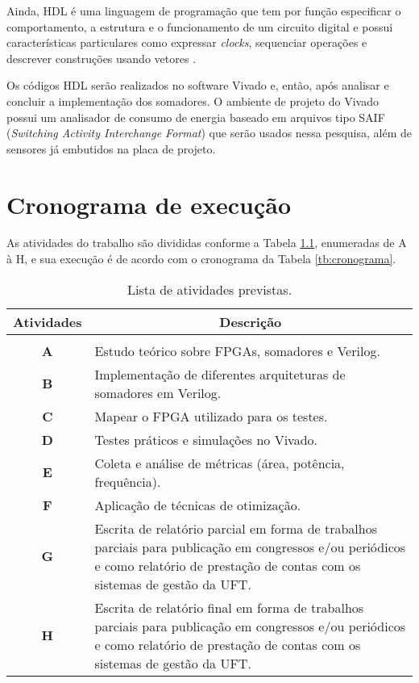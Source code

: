 \documentclass[12pt,consuni]{uftpibic}
\begin{document}
Ainda, HDL é uma linguagem de programação que tem por função especificar o comportamento, a estrutura e o funcionamento de um circuito digital e possui características particulares como expressar \textit{clocks}, sequenciar operações e descrever construções usando vetores \cite{Flake2020}. 

Os códigos HDL serão realizados no software Vivado e, então, após analisar e concluir a implementação dos somadores. O ambiente de projeto do Vivado possui um analisador de consumo de energia baseado em arquivos tipo SAIF (\textit{Switching Activity Interchange Format}) que serão usados nessa pesquisa, além de sensores já embutidos na placa de projeto. 

\vspace{1.5cm}
\chapter{Cronograma de execução}

As atividades do trabalho são divididas conforme a Tabela \ref{tb:atividades}, enumeradas de A à H, e sua execução é de acordo com o cronograma da Tabela \ref{tb:cronograma}.

\begin{table}[!h]
  \centering
  \caption{Lista de atividades previstas.}\label{tb:atividades}
  \begin{tabular}{cp{9.4cm}}
    \toprule
    {\bf Atividades} & \multicolumn{1}{c}{\bf Descrição} \\
    \midrule
    &\\[-0.4cm]
    \textbf{A} &  Estudo teórico sobre FPGAs, somadores e Verilog. \\[0.2cm]
    \textbf{B} &  Implementação de diferentes arquiteturas de somadores em Verilog.\\[0.2cm]
    \textbf{C} &  Mapear o FPGA utilizado para os testes.\\[0.2cm]
    \textbf{D} &  Testes práticos e simulações no Vivado.\\[0.2cm]
    \textbf{E} &  Coleta e análise de métricas (área, potência, frequência). \\[0.2cm]
    \textbf{F} &  Aplicação de técnicas de otimização. \\[0.2cm]
    \textbf{G} &  Escrita de relatório parcial em forma de trabalhos parciais para publicação em congressos e/ou periódicos e como relatório de prestação de contas com os sistemas de gestão da UFT. \\[0.2cm]
    \textbf{H} &  Escrita de relatório final em forma de trabalhos parciais para publicação em congressos e/ou periódicos e como relatório de prestação de contas com os sistemas de gestão da UFT. \\[0.2cm]
    \bottomrule
  \end{tabular}
\end{table}
\end{document}
